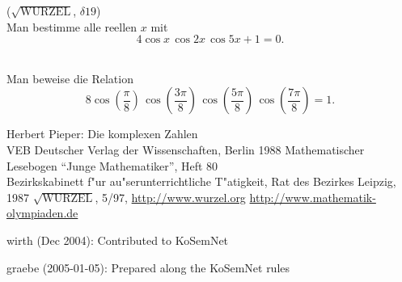 \documentclass[11pt]{article}
\begin{document}
\begin{aufgabe}($\sqrt{\mbox{WURZEL}}$, $\delta 19$)\\
  Man bestimme alle reellen $x$ mit
  \begin{equation*}
    4\cos x\,\cos 2x\,\cos 5x+1=0.
  \end{equation*}
\end{aufgabe}
\begin{aufgabe}\hspace*{1cm}\\
  Man beweise die Relation
  \begin{equation*}
    8 \cos\left(\frac\pi8\right)\,
    \cos\left(\frac{3\pi}8\right)\,
    \cos\left(\frac{5\pi}8\right)\,
    \cos\left(\frac{7\pi}8\right)=1.
  \end{equation*}
\end{aufgabe}
%
\begin{thebibliography}{99}
\bibitem{} Herbert Pieper: Die komplexen Zahlen\\ VEB Deutscher Verlag der
  Wissenschaften, Berlin 1988
 Mathematischer Lesebogen "`Junge Mathematiker"', Heft 80\\
  Bezirkskabinett f"ur au"serunterrichtliche T"atigkeit, Rat des Bezirkes
  Leipzig, 1987
 $\sqrt{\mbox{WURZEL}}$, 5/97, \url{http://www.wurzel.org}
 \url{http://www.mathematik-olympiaden.de}
\end{thebibliography}

\begin{attribution}
wirth (Dec 2004): Contributed to KoSemNet

graebe (2005-01-05): Prepared along the KoSemNet rules
\end{attribution}
\end{document}

